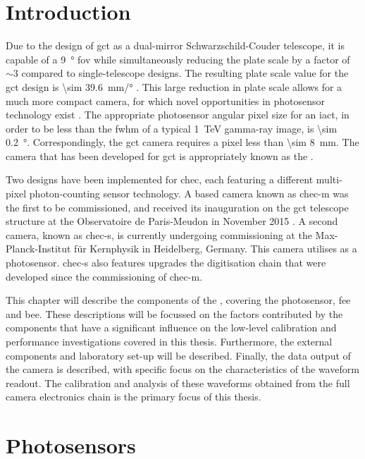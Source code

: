 \section{Introduction}

Due to the design of \gls{gct} as a dual-mirror Schwarzschild-Couder telescope, it is capable of a \SI{9}{\degree} \gls{fov}  while simultaneously reducing the plate scale by a factor of ${\sim} 3$ compared to single-telescope designs. The resulting plate scale value for the \gls{gct} design is \SI{\sim 39.6}{mm/\degree} \cite{Rulten2016}. This large reduction in plate scale allows for a much more compact camera, for which novel opportunities in photosensor technology exist \cite{Vassiliev2007}. The appropriate photosensor angular pixel size for an \gls{iact}, in order to be less than the \gls{fwhm} of a typical \SI{1}{TeV} gamma-ray image, is \SI{\sim 0.2}{\degree}. Correspondingly, the \gls{gct} camera requires a pixel less than \SI{\sim 8}{mm}. The camera that has been developed for \gls{gct} is appropriately known as the .

Two designs have been implemented for \gls{chec}, each featuring a different multi-pixel photon-counting sensor technology. A  based camera known as \gls{chec-m} was the first to be commissioned, and received its inauguration on the \gls{gct} telescope structure at the Observatoire de Paris-Meudon in November 2015 \cite{Watson2017}. A second camera, known as \gls{chec-s}, is currently undergoing commissioning at the Max-Planck-Institut für Kernphysik in Heidelberg, Germany. This camera utilises  as a photosensor. \gls{chec-s} also features upgrades the digitisation chain that were developed since the commissioning of \gls{chec-m}.

This chapter will describe the components of the , covering the photosensor, \gls{fee} and \gls{bee}. These descriptions will be focussed on the factors contributed by the components that have a significant influence on the low-level calibration and performance investigations covered in this thesis. Furthermore, the external components and laboratory set-up will be described. Finally, the data output of the camera is described, with specific focus on the characteristics of the waveform readout. The calibration and analysis of these waveforms obtained from the full camera electronics chain is the primary focus of this thesis.

\section{Photosensors}

